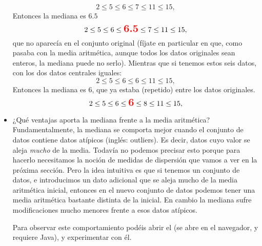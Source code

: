 \begin{itemize}
        \[
        2\leq 5\leq 6\leq 7\leq 11\leq 15,
        \]
        Entonces la mediana es $6.5$
        \[
        2\leq 5\leq 6\leq\textcolor{red}{\mbox{\Large\bf 6.5}}\leq 7\leq 11\leq 15,
        \]
        que no aparecía en el conjunto original (fíjate en particular en que, como pasaba con la media aritmética, aunque todos los datos originales sean enteros, la mediana puede no serlo). Mientras que si tenemos estos seis datos, con los dos datos centrales iguales:
        \[
        2\leq 5\leq 6\leq 6\leq 11\leq 15,
        \]
        Entonces la mediana es $6$, que ya estaba (repetido) entre los datos originales.
        \[
        2\leq 5\leq 6\leq\textcolor{red}{\mbox{\Large\bf 6}}\leq 8\leq 11\leq 15,
        \]

        \item ¿Qué {\sf ventajas} aporta la mediana frente a la media aritmética? Fundamentalmente, la mediana se comporta mejor cuando el conjunto de datos contiene {\sf datos atípicos} (inglés: outliers). Es decir, datos cuyo valor se aleja {\em mucho} de la media. Todavía no podemos precisar esto porque para hacerlo necesitamos la noción de medidas de dispersión que vamos a ver en la próxima sección. Pero la idea intuitiva es que si tenemos un conjunto de datos, e introducimos un dato adicional que se aleja mucho de la media aritmética inicial, entonces en el nuevo conjunto de datos podemos tener una media aritmética bastante distinta de la inicial. En cambio la mediana sufre modificaciones mucho menores frente a esos datos atípicos.

            Para observar este comportamiento podéis abrir el  (se abre en el navegador, y requiere Java), y experimentar con él.


\end{itemize}
